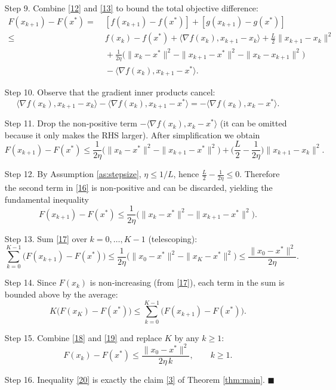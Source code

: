 \documentclass{article}
\begin{document}
\begin{enumerate}
\item[Step 9.]  Combine \eqref{12} and \eqref{13} to bound the total objective difference:
\[
\begin{aligned}
F(x_{k+1})-F(x^{*})
=&\;[f(x_{k+1})-f(x^{*})]+[g(x_{k+1})-g(x^{*})]\\[4pt]
\le&\;f(x_{k})-f(x^{*})+\langle\nabla f(x_{k}),x_{k+1}-x_{k}\rangle
+\frac{L}{2}\|x_{k+1}-x_{k}\|^{2}\\
&\;+\frac{1}{2\eta}\Big(\|x_{k}-x^{*}\|^{2}-\|x_{k+1}-x^{*}\|^{2}
-\|x_{k}-x_{k+1}\|^{2}\Big)\\
&\;-\langle\nabla f(x_{k}),x_{k+1}-x^{*}\rangle .
\end{aligned}
\tag{14}
\]

\item[Step 10.]  Observe that the gradient inner products cancel:
\[
\langle\nabla f(x_{k}),x_{k+1}-x_{k}\rangle
-\langle\nabla f(x_{k}),x_{k+1}-x^{*}\rangle
= -\langle\nabla f(x_{k}),x_{k}-x^{*}\rangle .
\tag{15}
\]

\item[Step 11.]  Drop the non‑positive term $-\langle\nabla f(x_{k}),x_{k}-x^{*}\rangle$ (it can be omitted because it only makes the RHS larger). After simplification we obtain
\[
F(x_{k+1})-F(x^{*})
\le \frac{1}{2\eta}\bigl(\|x_{k}-x^{*}\|^{2}-\|x_{k+1}-x^{*}\|^{2}\bigr)
+\Big(\frac{L}{2}-\frac{1}{2\eta}\Big)\|x_{k+1}-x_{k}\|^{2}.
\tag{16}
\]

\item[Step 12.]  By Assumption \ref{as:stepsize}, $\eta\le 1/L$, hence $\frac{L}{2}-\frac{1}{2\eta}\le0$. Therefore the second term in \eqref{16} is non‑positive and can be discarded, yielding the fundamental inequality
\[
F(x_{k+1})-F(x^{*})
\le \frac{1}{2\eta}\bigl(\|x_{k}-x^{*}\|^{2}-\|x_{k+1}-x^{*}\|^{2}\bigr).
\tag{17}
\]

\item[Step 13.]  Sum \eqref{17} over $k=0,\dots ,K-1$ (telescoping):
\[
\sum_{k=0}^{K-1}\bigl(F(x_{k+1})-F(x^{*})\bigr)
\le \frac{1}{2\eta}\bigl(\|x_{0}-x^{*}\|^{2}-\|x_{K}-x^{*}\|^{2}\bigr)
\le \frac{\|x_{0}-x^{*}\|^{2}}{2\eta}.
\tag{18}
\]

\item[Step 14.]  Since $F(x_{k})$ is non‑increasing (from \eqref{17}), each term in the sum is bounded above by the average:
\[
K\bigl(F(x_{K})-F(x^{*})\bigr)
\le \sum_{k=0}^{K-1}\bigl(F(x_{k+1})-F(x^{*})\bigr).
\tag{19}
\]

\item[Step 15.]  Combine \eqref{18} and \eqref{19} and replace $K$ by any $k\ge1$:
\[
F(x_{k})-F(x^{*})\le\frac{\|x_{0}-x^{*}\|^{2}}{2\eta\,k},
\qquad k\ge1.
\tag{20}
\]

\item[Step 16.]  Inequality \eqref{20} is exactly the claim \eqref{3} of Theorem \ref{thm:main}. \hfill $\blacksquare$
\end{enumerate}
\end{document}
